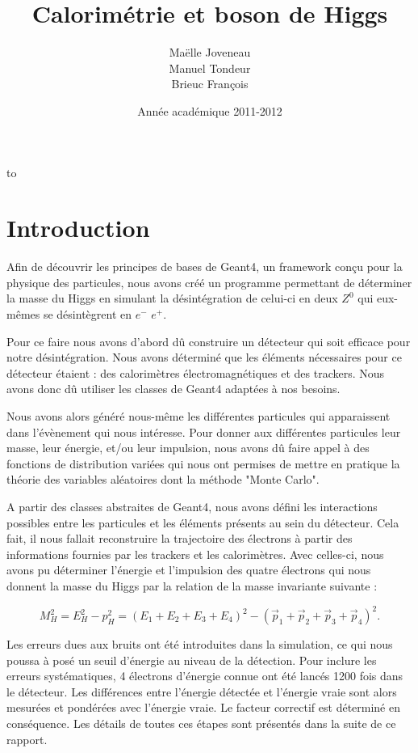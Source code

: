 \documentclass[11pt]{article}
\title{Calorimétrie et boson de Higgs}
\author{ Maëlle Joveneau \\ Manuel Tondeur \\ Brieuc François }
\date{Année académique 2011-2012}
\makeatletter
\def\clap#1{\hbox to 0pt{\hss #1\hss}}%
\def\haut#1#2#3{%
\hbox to \hsize{%
\rlap{\vtop{\raggedright #1}}%
\hss
\clap{\vtop{\centering #2}}%
\hss
\llap{\vtop{\raggedleft #3}}}}%
\def\bas#1#2#3{%
\hbox to \hsize{%
\rlap{\vbox{\raggedright #1}}%
\hss
\clap{\vbox{\centering #2}}%
\hss
\llap{\vbox{\raggedleft #3}}}}%
\def\maketitle{%
\thispagestyle{empty}\vbox to \vsize{%
\haut{}{\@blurb}{}
\vfill
\vspace{1cm}
\begin{flushleft}
\usefont{OT1}{ptm}{m}{n}
\huge \@title
\end{flushleft}
\par
\hrule height 4pt
\par
\begin{flushright}
\usefont{OT1}{phv}{m}{n}
\Large \@author
\par
\end{flushright}
\vspace{1cm}
\vfill
\vfill
\bas{}{\@location, \@date}{}
}%
\cleardoublepage
}
\makeatother
\begin{document}
	\maketitle
		
	\tableofcontents

	\newpage
	
			\section{Introduction}
	Afin de d\'ecouvrir les principes de bases de Geant4, un framework conçu
pour la physique des particules, nous avons cr\'eé un programme permettant de
d\'eterminer la masse du Higgs en simulant la d\'esint\'egration de celui-ci en
deux $Z^0$ qui eux-m\^emes se d\'esint\`egrent en $e^-$ $e^+$.

Pour ce faire nous avons d'abord dû construire un d\'etecteur qui soit efficace
pour notre d\'esint\'egration. Nous avons d\'etermin\'e que les \'el\'ements
n\'ecessaires pour ce d\'etecteur \'etaient : des calorim\`etres
\'electromagn\'etiques et des trackers. Nous avons donc dû utiliser les classes
de Geant4 adaptées à nos besoins.
 
Nous avons alors g\'en\'er\'e nous-m\^eme les diff\'erentes particules qui
apparaissent dans l'\'ev\`enement qui nous int\'eresse. Pour donner aux
diff\'erentes particules leur masse, leur \'energie, et/ou leur impulsion, nous
avons dû faire appel \`a des fonctions de distribution vari\'ees qui nous ont
permises de mettre en pratique la th\'eorie des variables aléatoires dont la
méthode "Monte Carlo".
 
A partir des classes abstraites de Geant4, nous avons défini les interactions
possibles entre les particules et les \'el\'ements pr\'esents au sein du
d\'etecteur. Cela fait, il nous fallait reconstruire la trajectoire des
\'electrons \`a partir des informations fournies par les trackers et les
calorim\`etres. Avec celles-ci, nous avons pu d\'eterminer l'\'energie et
l'impulsion des quatre \'electrons qui nous donnent la masse du Higgs par la
relation de la masse invariante suivante : 
 
\begin{equation}
M_H^2=E_H^2-p_H^2=(E_1+E_2+E_3+E_4)^2-(\vec{p}_1+\vec{p}_2+\vec{p}_3+\vec{p}_4)^2.
\end{equation} 
    
Les erreurs dues aux bruits ont \'et\'e introduites dans la simulation, ce qui
nous poussa à posé un seuil d'\'energie au niveau de la 
d\'etection. Pour inclure les erreurs syst\'ematiques, 4 électrons d'énergie connue ont été lancés 1200 fois dans 
le détecteur. Les diff\'erences entre l'énergie détectée et l'énergie vraie sont alors mesurées et pondérées avec 
l'énergie vraie. Le facteur correctif est déterminé en conséquence. Les
d\'etails de toutes ces \'etapes sont pr\'esent\'es dans la suite de ce rapport.
\end{document}
